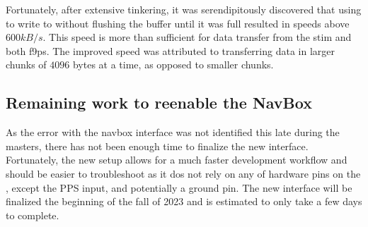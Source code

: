 Fortunately, after extensive tinkering, it was serendipitously discovered that using  to write to  without flushing the buffer until it was full resulted in speeds above $600kB/s$.
This speed is more than sufficient for data transfer from the \gls{stim} and both \glspl{f9p}.
The improved speed was attributed to transferring data in larger chunks of $4096$ bytes at a time, as opposed to smaller chunks.

\subsection{Remaining work to reenable the NavBox}
As the error with the \gls{navbox} interface was not identified this late during the masters, there has not been enough time to finalize the new interface.
Fortunately, the new setup allows for a much faster development workflow and should be easier to troubleshoot as it dos not rely on any of hardware pins on the \jx, except the PPS input, and potentially a ground pin.
The new interface will be finalized the beginning of the fall of 2023 and is estimated to only take a few days to complete.





